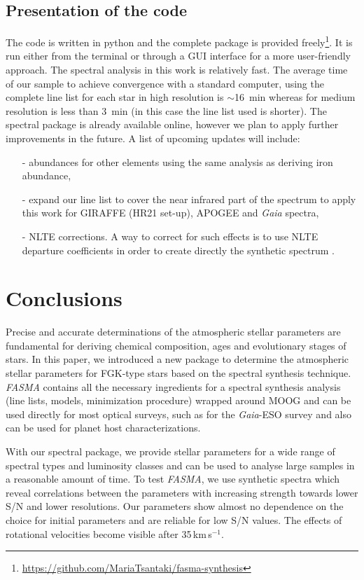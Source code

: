 \documentclass[fleqn,usenatbib]{mnras}
\begin{document}
\subsection{Presentation of the code} 

The code is written in python and the complete package is provided freely\footnote{\url{https://github.com/MariaTsantaki/fasma-synthesis}}. It is run either from the terminal or 
through a GUI interface for a more user-friendly approach. The spectral analysis in this work is relatively fast. The average time of our sample to achieve convergence with a standard 
computer, using the complete line list for each star in high resolution is $\sim$16~min whereas for medium resolution is less than 3~min (in this case the line list used is shorter).
The spectral package is already available online, however we plan to apply further improvements in the future. A list of upcoming updates will include: 
\begin{itemize}
 \item[-] abundances for other elements using the same analysis as deriving iron abundance,
 \item[-] expand our line list to cover the near infrared part of the spectrum to apply this work for GIRAFFE (HR21 set-up), APOGEE and \textit{Gaia} spectra, 
 \item[-] NLTE corrections. A way to correct for such effects is to use NLTE departure coefficients in order to create directly the synthetic spectrum \citep{Piskunov2016}.  
\end{itemize}

\section{Conclusions}

Precise and accurate determinations of the atmospheric stellar parameters are fundamental for deriving chemical composition, ages and evolutionary stages of stars. 
In this paper, we introduced a new package to determine the atmospheric stellar parameters for FGK-type stars based on the spectral synthesis technique. \textit{FASMA} contains 
all the necessary ingredients for a spectral synthesis analysis (line lists, models, minimization procedure) wrapped around MOOG and can be used directly for most optical surveys, 
such as for the \textit{Gaia}-ESO survey and also can be used for planet host characterizations. 

With our spectral package, we provide stellar parameters for a wide range of spectral types and luminosity classes and can be used to analyse large samples in a reasonable amount of time.
To test \textit{FASMA}, we use synthetic spectra which reveal correlations between the parameters with increasing strength towards lower S/N and lower resolutions. 
Our parameters show almost no dependence on the choice for initial parameters and are reliable for low S/N values. 
The effects of rotational velocities become visible after 35\,km\,s$^{-1}$. 
\end{document}
